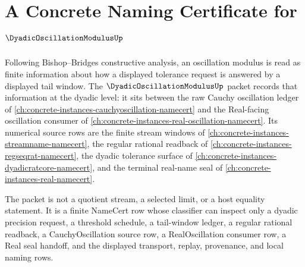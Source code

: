 \chapter{A Concrete Naming Certificate for $\DyadicOscillationModulusUp$}
\label{ch:concrete-instances-dyadic-oscillation-modulus-namecert}

Following Bishop--Bridges constructive analysis, an oscillation modulus is read as finite information about how a displayed tolerance request is answered by a displayed tail window. The $\DyadicOscillationModulusUp$ packet records that information at the dyadic level: it sits between the raw Cauchy oscillation ledger of \autoref{ch:concrete-instances-cauchyoscillation-namecert} and the Real-facing oscillation consumer of \autoref{ch:concrete-instances-real-oscillation-namecert}. Its numerical source rows are the finite stream windows of \autoref{ch:concrete-instances-streamname-namecert}, the regular rational readback of \autoref{ch:concrete-instances-regseqrat-namecert}, the dyadic tolerance surface of \autoref{ch:concrete-instances-dyadicratcore-namecert}, and the terminal real-name seal of \autoref{ch:concrete-instances-real-namecert}.

The packet is not a quotient stream, a selected limit, or a host equality statement. It is a finite NameCert row whose classifier can inspect only a dyadic precision request, a threshold schedule, a tail-window ledger, a regular rational readback, a CauchyOscillation source row, a RealOscillation consumer row, a Real seal handoff, and the displayed transport, replay, provenance, and local naming rows.

